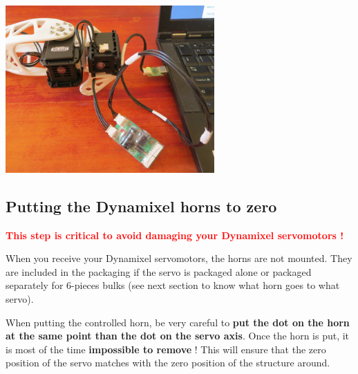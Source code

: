 \documentclass{article}
\begin{document}
 \begin{center}
  \includegraphics[width=0.6\textwidth]{img/daisy_link}
 \end{center}
 

\subsection{Putting the Dynamixel horns to zero}
\label{dynamixel-zero}

\textcolor{red}{\textbf{This step is critical to avoid damaging your Dynamixel servomotors !}}

When you receive your Dynamixel servomotors, the horns are not mounted. They are included in the packaging if the servo is packaged alone or packaged separately for 6-pieces bulks (see next section to know what horn goes to what servo).

When putting the controlled horn, be very careful to \textbf{put the dot on the horn at the same point than the dot on the servo axis}. Once the horn is put, it is most of the time \textbf{impossible to remove} ! This will ensure that the zero position of the servo matches with the zero position of the structure around.
\end{document}
